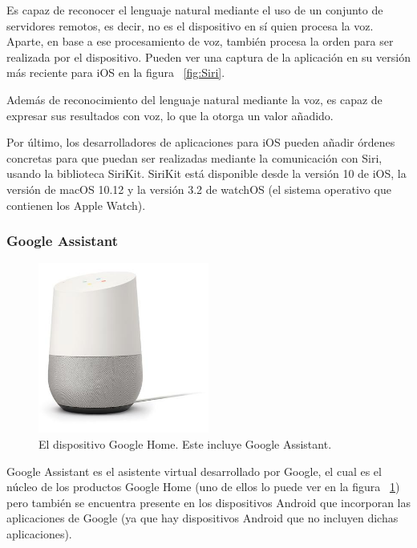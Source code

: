 \documentclass[spanish,12pt, a4paper, twoside]{paper}
\begin{document}
Es capaz de reconocer el lenguaje natural mediante el uso de un conjunto de servidores remotos, es decir, no es el dispositivo en sí quien procesa la voz. Aparte, en base a ese procesamiento de voz, también procesa la orden para ser realizada por el dispositivo. Pueden ver una captura de la aplicación en su versión más reciente para iOS en la figura ~\ref{fig:Siri}.
\newline

Además de reconocimiento del lenguaje natural mediante la voz, es capaz de expresar sus resultados con voz, lo que la otorga un valor añadido.
\newline

Por último, los desarrolladores de aplicaciones para iOS pueden añadir órdenes concretas para que puedan ser realizadas mediante la comunicación con Siri, usando la biblioteca SiriKit. SiriKit está disponible desde la versión 10 de iOS, la versión de macOS 10.12 y la versión 3.2 de watchOS (el sistema operativo que contienen los Apple Watch).

\subsubsection{Google Assistant}

\begin{figure}
\centering
	\includegraphics[width=0.5\textwidth]{recursos/homeG}
\caption{El dispositivo Google Home. Este incluye Google Assistant.}
\label{fig:Dispositivo Google Home}
\end{figure}

Google Assistant es el asistente virtual desarrollado por Google, el cual es el núcleo de los productos Google Home (uno de ellos lo puede ver en la figura ~\ref{fig:Dispositivo Google Home}) pero también se encuentra presente en los dispositivos Android que incorporan las aplicaciones de Google (ya que hay dispositivos Android que no incluyen dichas aplicaciones).
\newline
\end{document}
